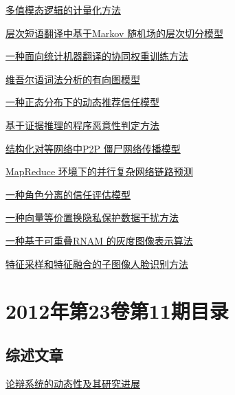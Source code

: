 \documentclass[a4paper]{article}
\begin{document}
\href{http://www.jos.org.cn/ch/reader/download_pdf.aspx?file_no=4212&year_id=2012&quarter_id=12&falg=1}{多值模态逻辑的计量化方法}

\href{http://www.jos.org.cn/ch/reader/download_pdf.aspx?file_no=4207&year_id=2012&quarter_id=12&falg=1}{层次短语翻译中基于Markov 随机场的层次切分模型}

\href{http://www.jos.org.cn/ch/reader/download_pdf.aspx?file_no=4208&year_id=2012&quarter_id=12&falg=1}{一种面向统计机器翻译的协同权重训练方法}

\href{http://www.jos.org.cn/ch/reader/download_pdf.aspx?file_no=4205&year_id=2012&quarter_id=12&falg=1}{维吾尔语词法分析的有向图模型}

\href{http://www.jos.org.cn/ch/reader/download_pdf.aspx?file_no=4204&year_id=2012&quarter_id=12&falg=1}{一种正态分布下的动态推荐信任模型}

\href{http://www.jos.org.cn/ch/reader/download_pdf.aspx?file_no=4221&year_id=2012&quarter_id=12&falg=1}{基于证据推理的程序恶意性判定方法}

\href{http://www.jos.org.cn/ch/reader/download_pdf.aspx?file_no=4186&year_id=2012&quarter_id=12&falg=1}{结构化对等网络中P2P 僵尸网络传播模型}

\href{http://www.jos.org.cn/ch/reader/download_pdf.aspx?file_no=4206&year_id=2012&quarter_id=12&falg=1}{MapReduce 环境下的并行复杂网络链路预测}

\href{http://www.jos.org.cn/ch/reader/download_pdf.aspx?file_no=4180&year_id=2012&quarter_id=12&falg=1}{一种角色分离的信任评估模型}

\href{http://www.jos.org.cn/ch/reader/download_pdf.aspx?file_no=4286&year_id=2012&quarter_id=12&falg=1}{一种向量等价置换隐私保护数据干扰方法}

\href{http://www.jos.org.cn/ch/reader/download_pdf.aspx?file_no=4236&year_id=2012&quarter_id=12&falg=1}{一种基于可重叠RNAM 的灰度图像表示算法}

\href{http://www.jos.org.cn/ch/reader/download_pdf.aspx?file_no=4199&year_id=2012&quarter_id=12&falg=1}{特征采样和特征融合的子图像人脸识别方法}


\section{\textbf{2012年第23卷第11期目录}}
\subsection{综述文章}
\href{http://www.jos.org.cn/ch/reader/download_pdf.aspx?file_no=4302&year_id=2012&quarter_id=11&falg=1}{论辩系统的动态性及其研究进展}
\end{document}
